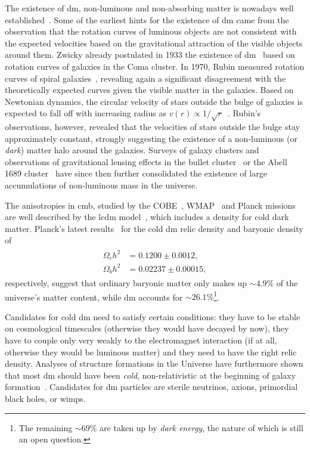 The existence of \gls{dm}, \ie non-luminous and non-absorbing matter is nowadays well established~\cite{pdg2020}. Some of the earliest hints for the existence of \gls{dm} came from the observation that the rotation curves of luminous objects are not consistent with the expected velocities based on the gravitational attraction of the visible objects around them. Zwicky already postulated in 1933 the existence of \gls{dm}~\cite{Zwicky:437297} based on rotation curves of galaxies in the Coma cluster. In 1970, Rubin measured rotation curves of spiral galaxies~\cite{Rubin:1970zza}, revealing again a significant disagreement with the theoretically expected curves given the visible matter in the galaxies. Based on Newtonian dynamics, the circular velocity of stars outside the bulge of galaxies is expected to fall off with increasing radius as $v(r) \propto 1/\sqrt{r}$~\cite{Bertone:2004pz}. Rubin's observations, however, revealed that the velocities of stars outside the bulge stay approximately constant, strongly suggesting the existence of a non-luminous (or \textit{dark}) matter halo around the galaxies. Surveys of galaxy clusters and observations of gravitational lensing effects \eg in the bullet cluster~\cite{Clowe:2006eq} or the Abell 1689 cluster~\cite{Taylor:1998uk} have since then further consolidated the existence of large accumulations of non-luminous mass in the universe.

The anisotropies in \gls{cmb}, studied by the COBE~\cite{Bennett:1996ce,COBE}, WMAP~\cite{WMAP2,WMAP1} and Planck missions~\cite{Planck} are well described by the \gls{lcdm} model~\cite{Liddle:1976476}, which includes a density for cold dark matter. Planck's latest results~\cite{Aghanim:2018eyx} for the cold \gls{dm} relic density and baryonic density of
\begin{align}
\begin{split}
	\Omega_c h^2 &= 0.1200\pm0.0012, \\
	\Omega_b h^2 &= 0.02237\pm0.00015,
\end{split}
\end{align}
respectively, suggest that ordinary baryonic matter only makes up $\sim 4.9\%$ of the universe's matter content, while \gls{dm} accounts for $\sim 26.1\%$\footnote{The remaining $\sim 69\%$ are taken up by \textit{dark energy}, the nature of which is still an open question.}.

Candidates for cold \gls{dm} need to satisfy certain conditions: they have to be stable on cosmological timescales (otherwise they would have decayed by now), they have to couple only very weakly to the electromagnet interaction (if at all, otherwise they would be luminous matter) and they need to have the right relic density. Analyses of structure formations in the Universe have furthermore shown that most \gls{dm} should have been \textit{cold}, \ie non-relativistic at the beginning of galaxy formation~\cite{Bertone:2004pz}. Candidates for \gls{dm} particles are \eg sterile neutrinos, axions, primordial black holes, or \glspl{wimp}.

